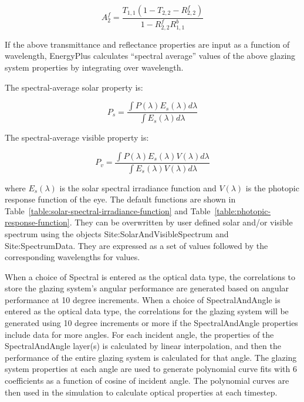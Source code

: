 \begin{equation}
A_2^f = \frac{{{T_{1,1}}(1 - {T_{2,2}} - R_{2,2}^f)}}{{1 - R_{2,2}^fR_{1,1}^b}}
\end{equation}

If the above transmittance and reflectance properties are input as a function of wavelength, EnergyPlus calculates ``spectral average'' values of the above glazing system properties by integrating over wavelength.

The spectral-average solar property is:

\begin{equation}
{P_s} = \frac{{\int {P(\lambda ){E_s}(\lambda )d\lambda } }}{{\int {{E_s}(\lambda )d\lambda } }}
\end{equation}

The spectral-average visible property is:

\begin{equation}
{P_v} = \frac{{\int {P(\lambda ){E_s}(\lambda )V(\lambda )d\lambda } }}{{\int {{E_s}(\lambda )V(\lambda )d\lambda } }}
\end{equation}

where \({E_s}(\lambda )\) is the solar spectral irradiance function and \(V(\lambda )\) is the photopic response function of the eye. The default functions are shown in Table~\ref{table:solar-spectral-irradiance-function} and Table~\ref{table:photopic-response-function}. They can be overwritten by user defined solar and/or visible spectrum using the objects Site:SolarAndVisibleSpectrum and Site:SpectrumData. They are expressed as a set of values followed by the corresponding wavelengths for values.

When a choice of Spectral is entered as the optical data type, the correlations to store the glazing system's angular performance are generated based on angular performance at 10 degree increments. When a choice of SpectralAndAngle is entered as the optical data type, the correlations for the glazing system will be generated using 10 degree increments or more if the SpectralAndAngle properties include data for more angles.  For each incident angle, the properties of the SpectralAndAngle layer(s) is calculated by linear interpolation, and then the performance of the entire glazing system is calculated for that angle.  The glazing system properties at each angle are used to generate polynomial curve fits with 6 coefficients as a function of cosine of incident angle. The polynomial curves are then used in the simulation to calculate optical properties at each timestep.

